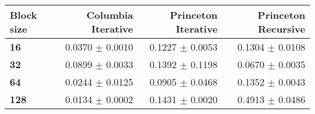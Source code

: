 \begin{tabular}{lrrr}\toprule
\textbf{Block size}  & \textbf{Columbia Iterative} & \textbf{Princeton Iterative} & \textbf{Princeton Recursive}\\\midrule
\textbf{16}  & 0.0370 $\pm$ 0.0010 & 0.1227 $\pm$ 0.0053 & 0.1304 $\pm$ 0.0108\\
\textbf{32}  & 0.0899 $\pm$ 0.0033 & 0.1392 $\pm$ 0.1198 & 0.0670 $\pm$ 0.0035\\
\textbf{64}  & 0.0244 $\pm$ 0.0125 & 0.0905 $\pm$ 0.0468 & 0.1352 $\pm$ 0.0043\\
\textbf{128} & 0.0134 $\pm$ 0.0002 & 0.1431 $\pm$ 0.0020 & 0.4913 $\pm$ 0.0486\\
\bottomrule
\end{tabular}
